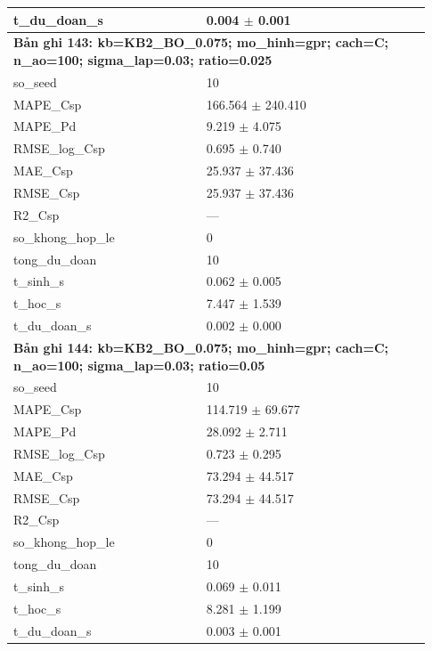 \begin{longtable}{p{0.43\linewidth}p{0.50\linewidth}}
t\_\allowbreak du\_\allowbreak doan\_\allowbreak s & 0.004 $\pm$ 0.001 \\
\midrule
\multicolumn{2}{p{0.95\linewidth}}{\textbf{Bản ghi 143: kb=KB2\_BO\_0.075; mo\_hinh=gpr; cach=C; n\_ao=100; sigma\_lap=0.03; ratio=0.025}} \\
so\_\allowbreak seed & 10 \\
MAPE\_\allowbreak Csp & 166.564 $\pm$ 240.410 \\
MAPE\_\allowbreak Pd & 9.219 $\pm$ 4.075 \\
RMSE\_\allowbreak log\_\allowbreak Csp & 0.695 $\pm$ 0.740 \\
MAE\_\allowbreak Csp & 25.937 $\pm$ 37.436 \\
RMSE\_\allowbreak Csp & 25.937 $\pm$ 37.436 \\
R2\_\allowbreak Csp & — \\
so\_\allowbreak khong\_\allowbreak hop\_\allowbreak le & 0 \\
tong\_\allowbreak du\_\allowbreak doan & 10 \\
t\_\allowbreak sinh\_\allowbreak s & 0.062 $\pm$ 0.005 \\
t\_\allowbreak hoc\_\allowbreak s & 7.447 $\pm$ 1.539 \\
t\_\allowbreak du\_\allowbreak doan\_\allowbreak s & 0.002 $\pm$ 0.000 \\
\midrule
\multicolumn{2}{p{0.95\linewidth}}{\textbf{Bản ghi 144: kb=KB2\_BO\_0.075; mo\_hinh=gpr; cach=C; n\_ao=100; sigma\_lap=0.03; ratio=0.05}} \\
so\_\allowbreak seed & 10 \\
MAPE\_\allowbreak Csp & 114.719 $\pm$ 69.677 \\
MAPE\_\allowbreak Pd & 28.092 $\pm$ 2.711 \\
RMSE\_\allowbreak log\_\allowbreak Csp & 0.723 $\pm$ 0.295 \\
MAE\_\allowbreak Csp & 73.294 $\pm$ 44.517 \\
RMSE\_\allowbreak Csp & 73.294 $\pm$ 44.517 \\
R2\_\allowbreak Csp & — \\
so\_\allowbreak khong\_\allowbreak hop\_\allowbreak le & 0 \\
tong\_\allowbreak du\_\allowbreak doan & 10 \\
t\_\allowbreak sinh\_\allowbreak s & 0.069 $\pm$ 0.011 \\
t\_\allowbreak hoc\_\allowbreak s & 8.281 $\pm$ 1.199 \\
t\_\allowbreak du\_\allowbreak doan\_\allowbreak s & 0.003 $\pm$ 0.001 \\

\end{longtable}
